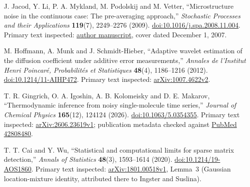 J. Jacod, Y. Li, P. A. Mykland, M. Podolskij and M. Vetter,
``Microstructure noise in the continuous case: The pre-averaging approach,''
\emph{Stochastic Processes and their Applications}
\textbf{119}(7), 2249--2276 (2009).
\href{https://doi.org/10.1016/j.spa.2008.11.004}{doi:10.1016/j.spa.2008.11.004}.
Primary text inspected:
\href{https://www.stat.uchicago.edu/~mykland/paperlinks/JLMPV.pdf}{author manuscript},
cover dated December 1, 2007.

M. Hoffmann, A. Munk and J. Schmidt-Hieber,
``Adaptive wavelet estimation of the diffusion coefficient under additive error measurements,''
\emph{Annales de l'Institut Henri Poincar\'e, Probabilit\'es et Statistiques}
\textbf{48}(4), 1186--1216 (2012).
\href{https://doi.org/10.1214/11-AIHP472}{doi:10.1214/11-AIHP472}.
Primary text inspected:
\href{https://arxiv.org/abs/1007.4622v2}{arXiv:1007.4622v2}.

T. R. Gingrich, O. A. Igoshin, A. B. Kolomeisky and D. E. Makarov,
``Thermodynamic inference from noisy single-molecule time series,''
\emph{Journal of Chemical Physics} \textbf{165}(12), 124124 (2026).
\href{https://doi.org/10.1063/5.0354355}{doi:10.1063/5.0354355}.
Primary text inspected:
\href{https://arxiv.org/abs/2606.23619v1}{arXiv:2606.23619v1};
publication metadata checked against
\href{https://pubmed.ncbi.nlm.nih.gov/42808480/}{PubMed 42808480}.

T. T. Cai and Y. Wu,
``Statistical and computational limits for sparse matrix detection,''
\emph{Annals of Statistics} \textbf{48}(3), 1593--1614 (2020).
\href{https://doi.org/10.1214/19-AOS1860}{doi:10.1214/19-AOS1860}.
Primary text inspected:
\href{https://arxiv.org/abs/1801.00518v1}{arXiv:1801.00518v1},
Lemma~3 (Gaussian location-mixture identity, attributed there to Ingster and Suslina).
